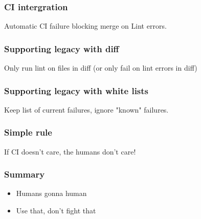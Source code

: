 \begin{frame}
\frametitle{CI intergration}
Automatic CI failure blocking merge on Lint errors.
\end{frame}

\begin{frame}
\frametitle{Supporting legacy with diff}
Only run lint on files in diff
(or only fail on lint errors in diff)
\end{frame}

\begin{frame}
\frametitle{Supporting legacy with white lists}
Keep list of current failures,
ignore "known" failures.
\end{frame}

\begin{frame}
\frametitle{Simple rule}
If CI doesn't care,
the humans don't care!
\end{frame}

\begin{frame}
\frametitle{Summary}
\begin{itemize}
\item Humans gonna human
\item Use that, don't fight that
\end{itemize}
\end{frame}


